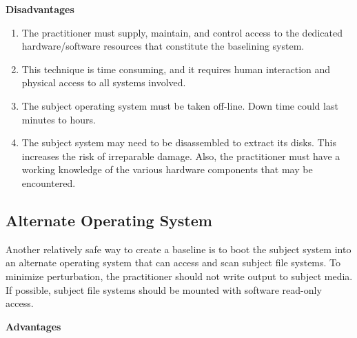 \documentclass[10pt]{article}
\begin{document}
  \textbf{Disadvantages}

\begin{enumerate}

  \item
  The practitioner must supply, maintain, and control access to
  the dedicated hardware/software resources that constitute the
  baselining system.

  \item 
  This technique is time consuming, and it requires human interaction
  and physical access to all systems involved.

  \item
  The subject operating system must be taken off-line.  Down time
  could last minutes to hours.

  \item
  The subject system may need to be disassembled to extract its
  disks.  This increases the risk of irreparable damage.  Also,
  the practitioner must have a working knowledge of the various
  hardware components that may be encountered.

\end{enumerate}

\subsection{Alternate Operating System}

Another relatively safe way to create a baseline is to boot the
subject system into an alternate operating system that can access
and scan subject file systems.  To minimize perturbation, the
practitioner should not write output to subject media.  If possible,
subject file systems should be mounted with software read-only
access.

  \textbf{Advantages}
\end{document}
